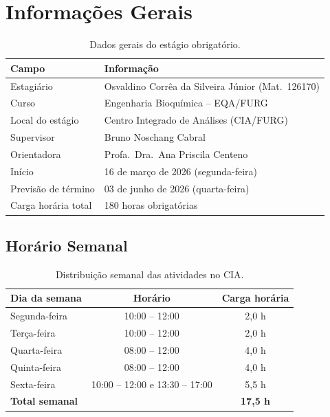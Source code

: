 
\section{Informações Gerais}

\begin{table}[H]
\centering
\caption{Dados gerais do estágio obrigatório.}
\begin{tabular}{ll}
\toprule
\textbf{Campo} & \textbf{Informação} \\
\midrule
Estagiário          & Osvaldino Corrêa da Silveira Júnior (Mat.\ 126170) \\
Curso               & Engenharia Bioquímica -- EQA/FURG \\
Local do estágio    & Centro Integrado de Análises (CIA/FURG) \\
Supervisor          & Bruno Noschang Cabral \\
Orientadora         & Profa.\ Dra.\ Ana Priscila Centeno \\
Início              & 16 de março de 2026 (segunda-feira) \\
Previsão de término & 03 de junho de 2026 (quarta-feira) \\
Carga horária total & 180 horas obrigatórias \\
\bottomrule
\end{tabular}
\end{table}

\subsection{Horário Semanal}

\begin{table}[H]
\centering
\caption{Distribuição semanal das atividades no CIA.}
\begin{tabular}{lcc}
\toprule
\textbf{Dia da semana} & \textbf{Horário} & \textbf{Carga horária} \\
\midrule
Segunda-feira & 10:00 -- 12:00 & 2{,}0 h \\
Terça-feira   & 10:00 -- 12:00 & 2{,}0 h \\
Quarta-feira  & 08:00 -- 12:00 & 4{,}0 h \\
Quinta-feira  & 08:00 -- 12:00 & 4{,}0 h \\
Sexta-feira   & 10:00 -- 12:00 e 13:30 -- 17:00 & 5{,}5 h \\
\midrule
\textbf{Total semanal} & & \textbf{17{,}5 h} \\
\bottomrule
\end{tabular}
\end{table}

